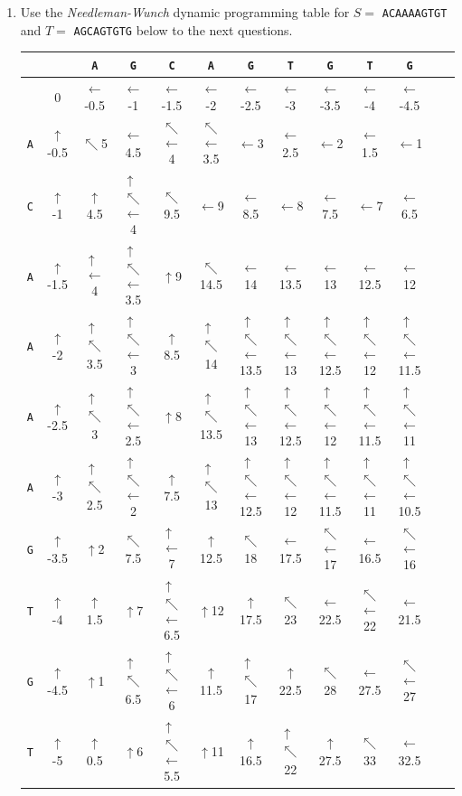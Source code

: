 \documentclass[11pt, oneside]{article}   	%
\newcommand{\diru}{$\uparrow$}
\newcommand{\dirl}{$\leftarrow$}
\newcommand{\dird}{$\nwarrow$}
\newcommand{\dirdl}{$\substack{\nwarrow\\\leftarrow}$}
\newcommand{\dirdu}{$\substack{\uparrow\\\nwarrow}$}
\newcommand{\dirlu}{$\substack{\uparrow\\\leftarrow}$}
\newcommand{\dirdlu}{$\substack{\uparrow\\\nwarrow\\\leftarrow}$}
\begin{document}
\clearpage
\begin{enumerate}
\item Use the \textit{Needleman-Wunch} dynamic programming table for $S = $ \texttt{ACAAAAGTGT} and $T = $ \texttt{AGCAGTGTG} below to the next questions.
%
\renewcommand{\arraystretch}{2}
\begin{center}
{\footnotesize
\begin{tabular}{|c||c|c|c|c|c|c|c|c|c|c|c|c|}
\hline
& & \texttt{A} &  \texttt{G} &  \texttt{C} &  \texttt{A} &  \texttt{G} &  \texttt{T} &  \texttt{G} &  \texttt{T} &  \texttt{G}\\
\hline
\hline
&  0 &	  \dirl -0.5 &	 \dirl  -1 &	\dirl -1.5 &	\dirl -2 &	\dirl -2.5 &	\dirl -3 &	\dirl -3.5 &	\dirl -4 &	\dirl -4.5 \\[1ex]
\hline
\texttt{A} &  \diru -0.5 &	 \dird 5  &	 \dirl 4.5 &	\dirdl 4 &	\dirdl 3.5 &	\dirl 3 &		\dirl 2.5 &	\dirl 2 &		\dirl 1.5 &	\dirl 1 \\[1ex]
\hline 
\texttt{C} &  \diru -1 & 	\diru 4.5 & 	 \dirdlu 4 &    \dird 9.5 & \dirl 9 &		\dirl 8.5 &	\dirl 8 &		\dirl 7.5 &	\dirl 7 &		\dirl 6.5\\[1ex]
\hline
\texttt{A} &  \diru -1.5 & 	\dirlu 4 & \dirdlu 3.5 & \diru 9 &  \dird 14.5 & \dirl 14 & \dirl 13.5 & \dirl 13 & \dirl 12.5 & \dirl 12 \\[1ex]
\hline 
\texttt{A} &  \diru -2 & \dirdu 3.5 & \dirdlu 3 & \diru 8.5 &   \dirdu 14 & \dirdlu 13.5 & \dirdlu 13 & \dirdlu 12.5 & \dirdlu 12 & \dirdlu 11.5 \\[1ex]
\hline 
\texttt{A} &  \diru -2.5 & \dirdu 3 & \dirdlu 2.5 & \diru 8 &   \dirdu 13.5 & \dirdlu 13 & \dirdlu 12.5 & \dirdlu 12 & \dirdlu 11.5 & \dirdlu 11 \\[1ex]
\hline 
\texttt{A} &  \diru -3 & \dirdu 2.5 & \dirdlu 2 & \diru 7.5 &   \dirdu 13 & \dirdlu 12.5 & \dirdlu 12 & \dirdlu 11.5 & \dirdlu 11 & \dirdlu 10.5 \\[1ex]
\hline  
\texttt{G} &  \diru -3.5 & \diru 2 & \dird 7.5 & \dirlu 7 & \diru 12.5 &   \dird 18 & \dirl 17.5 & \dirdl 17 & \dirl 16.5 & \dirdl 16  \\[1ex]
\hline 
\texttt{T} &  \diru -4 & \diru 1.5 & \diru 7 & \dirdlu 6.5 & \diru 12 & \diru 17.5 &   \dird 23 & \dirl 22.5 & \dirdl 22 & \dirl 21.5 \\[1ex]
\hline 
\texttt{G} &  \diru -4.5 & \diru 1 & \dirdu 6.5 & \dirdlu 6 & \diru 11.5 & \dirdu 17 & \diru 22.5 &   \dird 28 & \dirl 27.5 & \dirdl 27 \\[1ex]
\hline 
\texttt{T} &  \diru -5 & \diru 0.5 & \diru 6 & \dirdlu 5.5 & \diru 11 & \diru 16.5 & \dirdu 22 & \diru 27.5 &  \dird 33 &  \dirl 32.5 \\[1ex]

\end{tabular}}
\end{center}
\end{enumerate}
\end{document}
